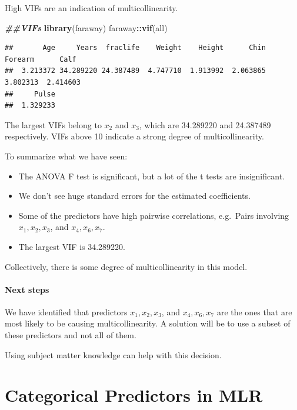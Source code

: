 \documentclass[
]{book}
\newenvironment{Shaded}{\begin{snugshade}}{\end{snugshade}}
\newcommand{\DocumentationTok}[1]{\textcolor[rgb]{0.56,0.35,0.01}{\textbf{\textit{#1}}}}
\newcommand{\FunctionTok}[1]{\textcolor[rgb]{0.13,0.29,0.53}{\textbf{#1}}}
\newcommand{\NormalTok}[1]{#1}
\newcommand{\SpecialCharTok}[1]{\textcolor[rgb]{0.81,0.36,0.00}{\textbf{#1}}}
\providecommand{\tightlist}{%
  \setlength{\itemsep}{0pt}\setlength{\parskip}{0pt}}
\begin{document}
High VIFs are an indication of multicollinearity.

\begin{Shaded}
\begin{Highlighting}[]
\DocumentationTok{\#\#VIFs}
\FunctionTok{library}\NormalTok{(faraway)}
\NormalTok{faraway}\SpecialCharTok{::}\FunctionTok{vif}\NormalTok{(all)}
\end{Highlighting}
\end{Shaded}

\begin{verbatim}
##       Age     Years  fraclife    Weight    Height      Chin   Forearm      Calf 
##  3.213372 34.289220 24.387489  4.747710  1.913992  2.063865  3.802313  2.414603 
##     Pulse 
##  1.329233
\end{verbatim}

The largest VIFs belong to \(x_2\) and \(x_3\), which are 34.289220 and 24.387489 respectively. VIFs above 10 indicate a strong degree of multicollinearity.

To summarize what we have seen:

\begin{itemize}
\tightlist
\item
  The ANOVA F test is significant, but a lot of the t tests are insignificant.
\item
  We don't see huge standard errors for the estimated coefficients.
\item
  Some of the predictors have high pairwise correlations, e.g.~Pairs involving \(x_1, x_2, x_3\), and \(x_4, x_6, x_7\).
\item
  The largest VIF is 34.289220.
\end{itemize}

Collectively, there is some degree of multicollinearity in this model.

\hypertarget{next-steps}{%
\subsubsection*{Next steps}\label{next-steps}}

We have identified that predictors \(x_1, x_2, x_3\), and \(x_4, x_6, x_7\) are the ones that are most likely to be causing multicollinearity. A solution will be to use a subset of these predictors and not all of them.

Using subject matter knowledge can help with this decision.

\hypertarget{cat}{%
\chapter{Categorical Predictors in MLR}\label{cat}}
\end{document}

